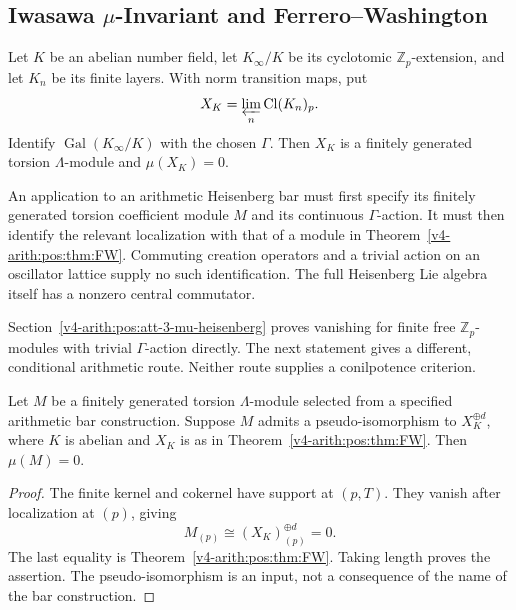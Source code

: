 \subsection{Iwasawa \texorpdfstring{\(\mu\)}{mu}-Invariant and Ferrero--Washington}
\label{v4-arith:pos:mu-FW}

\begin{theorem}
\label{v4-arith:pos:thm:FW}
Let \(K\) be an abelian number field, let \(K_\infty/K\)
be its cyclotomic \(\mathbb Z_p\)-extension, and let \(K_n\)
be its finite layers. With norm transition maps, put
\[
 X_K=\varprojlim_n\mathrm{Cl}(K_n)_p.
\]
Identify \(\operatorname{Gal}(K_\infty/K)\) with the chosen
\(\Gamma\). Then \(X_K\) is a finitely generated torsion
\(\Lambda\)-module and \(\mu(X_K)=0\).
\end{theorem}

\begin{remark}
\label{v4-arith:pos:rem:FW-applicability}
An application to an arithmetic Heisenberg bar must first specify
its finitely generated torsion coefficient module \(M\) and
its continuous \(\Gamma\)-action. It must then identify the
relevant localization with that of a module in
Theorem~\ref{v4-arith:pos:thm:FW}. Commuting creation operators
and a trivial action on an oscillator lattice supply no such
identification. The full Heisenberg Lie algebra itself has a
nonzero central commutator.

Section~\ref{v4-arith:pos:att-3-mu-heisenberg} proves vanishing for
finite free \(\mathbb Z_p\)-modules with trivial \(\Gamma\)-action
directly. The next statement gives a different, conditional
arithmetic route. Neither route supplies a conilpotence criterion.
\end{remark}

\begin{corollary}
\label{v4-arith:pos:cor:mu-zero-heisenberg}
Let \(M\) be a finitely generated torsion \(\Lambda\)-module
selected from a specified arithmetic bar construction.
Suppose \(M\) admits a pseudo-isomorphism to \(X_K^{\oplus d}\),
where \(K\) is abelian and \(X_K\) is as in
Theorem~\ref{v4-arith:pos:thm:FW}. Then \(\mu(M)=0\).
\end{corollary}

\begin{proof}
The finite kernel and cokernel have support at \((p,T)\).
They vanish after localization at \((p)\), giving
\[
 M_{(p)}\cong(X_K)_{(p)}^{\oplus d}=0.
\]
The last equality is Theorem~\ref{v4-arith:pos:thm:FW}.
Taking length proves the assertion. The pseudo-isomorphism is
an input, not a consequence of the name of the bar construction.
\end{proof}

